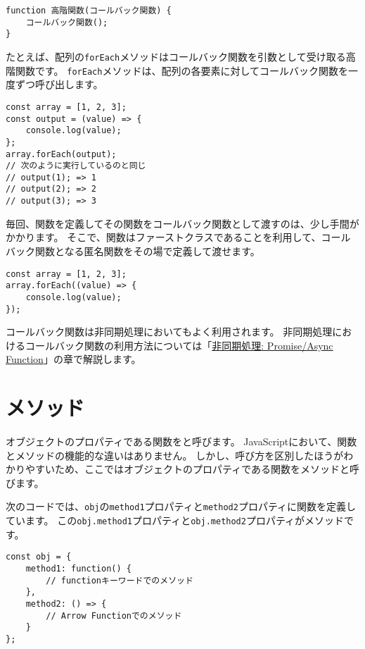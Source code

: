\begin{lstlisting}
function 高階関数(コールバック関数) {
    コールバック関数();
}
\end{lstlisting}

たとえば、配列の\texttt{forEach}メソッドはコールバック関数を引数として受け取る高階関数です。
\texttt{forEach}メソッドは、配列の各要素に対してコールバック関数を一度ずつ呼び出します。

\begin{lstlisting}
const array = [1, 2, 3];
const output = (value) => {
    console.log(value);
};
array.forEach(output);
// 次のように実行しているのと同じ
// output(1); => 1
// output(2); => 2
// output(3); => 3
\end{lstlisting}

毎回、関数を定義してその関数をコールバック関数として渡すのは、少し手間がかかります。
そこで、関数はファーストクラスであることを利用して、コールバック関数となる匿名関数をその場で定義して渡せます。

\begin{lstlisting}
const array = [1, 2, 3];
array.forEach((value) => {
    console.log(value);
});
\end{lstlisting}

コールバック関数は非同期処理においてもよく利用されます。
非同期処理におけるコールバック関数の利用方法については「\hyperlink{async-handling}{非同期処理: Promise/Async Function}」の章で解説します。

\hypertarget{method}{%
\section{メソッド}\label{method}}

オブジェクトのプロパティである関数を\textbf{}と呼びます。
JavaScriptにおいて、関数とメソッドの機能的な違いはありません。
しかし、呼び方を区別したほうがわかりやすいため、ここではオブジェクトのプロパティである関数をメソッドと呼びます。

\enlargethispage{\baselineskip}次のコードでは、\texttt{obj}の\texttt{method1}プロパティと\texttt{method2}プロパティに関数を定義しています。
この\texttt{obj.method1}プロパティと\texttt{obj.method2}プロパティがメソッドです。

\begin{lstlisting}
const obj = {
    method1: function() {
        // functionキーワードでのメソッド
    },
    method2: () => {
        // Arrow Functionでのメソッド
    }
};
\end{lstlisting}

